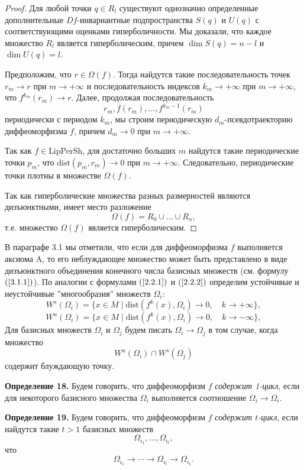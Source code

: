 \documentclass[12pt]{article}
\begin{document}
\begin{proof}
Для любой точки $q\in R_l$ существуют однозначно определенные дополнительные $Df$-инвариантные подпространства $S(q)$ и $U(q)$ с соответствующими оценками гиперболичности. Мы доказали, что каждое множество $R_l$ является гиперболическим, причем $\dim S(q)=n-l$ и $\dim U(q)=l$.

Предположим, что $r\in\Omega(f)$. Тогда найдутся такие последовательность точек $r_m\longrightarrow r$ при $m\rightarrow+\infty$ и последовательность индексов $k_m\longrightarrow+\infty$ при $m\rightarrow+\infty$, что $f^{k_m}(r_m)\longrightarrow r$. Далее, продолжая последовательность 
$$r_m,f(r_m),\ldots,f^{k_m-1}(r_m)$$
периодически с периодом $k_m$, мы строим периодическую $d_m$-псевдотраекторию диффеоморфизма $f$, причем $d_m\longrightarrow0$ при $m\rightarrow+\infty$. 

Так как $f\in\mbox{LipPerSh}$, для достаточно больших $m$ найдутся такие периодические точки $p_m$, что $\mbox{dist}(p_m,r_m)\longrightarrow0$ при $m\rightarrow+\infty$. Следовательно, периодические точки плотны в множестве $\Omega(f)$.

Так как гиперболические множества разных размерностей являются дизъюнктными, имеет место разложение
$$\Omega(f)=R_0\cup\ldots\cup R_n,$$   
т.е. множество $\Omega(f)$ является гиперболическим.   
\end{proof}

В параграфе 3.1 мы отметили, что если для диффеоморфизма $f$ выполняется аксиома A, то его неблуждающее множество может быть представлено в виде дизъюнктного объединения конечного числа базисных множеств (см. формулу $(\ref{3.1.1})$). По аналогии с формулами $(\ref{2.2.1})$ и $(\ref{2.2.2})$ определим устойчивые и неустойчивые ''многообразия'' множеств $\Omega_i$:
$$W^s(\Omega_i)=\{x\in M\mid \mbox{dist}(f^k(x),\Omega_i)\longrightarrow0,\quad k\rightarrow +\infty\},$$
$$W^u(\Omega_i)=\{x\in M\mid \mbox{dist}(f^k(x),\Omega_i)\longrightarrow0,\quad k\rightarrow -\infty\},$$
Для базисных множеств $\Omega_i$ и $\Omega_j$ будем писать $\Omega_i\rightarrow\Omega_j$ в том случае, когда множество
$$W^u(\Omega_i)\cap W^s(\Omega_j)$$
содержит блуждающую точку.

\textbf{Определение 18.} Будем говорить, что диффеоморфизм $f$ \textit{содержит 1-цикл}, если для некоторого базисного множества $\Omega_i$ выполняется соотношение $\Omega_i\rightarrow\Omega_i$.

\textbf{Определение 19.} Будем говорить, что диффеоморфизм $f$ \textit{содержит $t$-цикл}, если найдутся такие $t>1$ базисных множеств 
$$\Omega_{i_1},\ldots,\Omega_{i_t},$$
что
$$\Omega_{i_1}\rightarrow\cdots\rightarrow\Omega_{i_t}\rightarrow\Omega_{i_1}.$$
\end{document}
